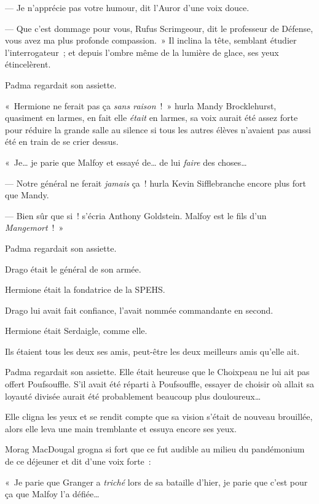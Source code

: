 --- Je n'apprécie pas votre humour, dit l'Auror d'une voix douce.

--- Que c'est dommage pour vous, Rufus Scrimgeour, dit le professeur de Défense, vous avez ma plus profonde compassion.~»
Il inclina la tête, semblant étudier l'interrogateur~; et depuis l'ombre même de la lumière de glace, ses yeux étincelèrent.

\later

Padma regardait son assiette.

«~Hermione ne ferait pas ça \emph{sans raison}~!~»
hurla Mandy Brocklehurst, quasiment en larmes, en fait elle \emph{était} en larmes, sa voix aurait été assez forte pour réduire la grande salle au silence si tous les autres élèves n'avaient pas aussi été en train de se crier dessus.

«~Je… je parie que Malfoy et essayé de… de lui \emph{faire} des choses…

--- Notre général ne ferait \emph{jamais} ça~! hurla Kevin Sifflebranche encore plus fort que Mandy.

--- Bien sûr que si~! s'écria Anthony Goldstein.
Malfoy est le fils d'un \emph{Mangemort}~!~»

\later

Padma regardait son assiette.

Drago était le général de son armée.

Hermione était la fondatrice de la SPEHS.

Drago lui avait fait confiance, l'avait nommée commandante en second.

Hermione était Serdaigle, comme elle.

Ils étaient tous les deux ses amis, peut-être les deux meilleurs amis qu'elle ait.

Padma regardait son assiette.
Elle était heureuse que le Choixpeau ne lui ait pas offert Poufsouffle.
S'il avait été réparti à Poufsouffle, essayer de choisir où allait sa loyauté divisée aurait été probablement beaucoup plus douloureux…

Elle cligna les yeux et se rendit compte que sa vision s'était de nouveau brouillée, alors elle leva une main tremblante et essuya encore ses yeux.

Morag MacDougal grogna si fort que ce fut audible au milieu du pandémonium de ce déjeuner et dit d'une voix forte~:

«~Je parie que Granger a \emph{triché} lors de sa bataille d'hier, je parie que c'est pour ça que Malfoy l'a défiée…

